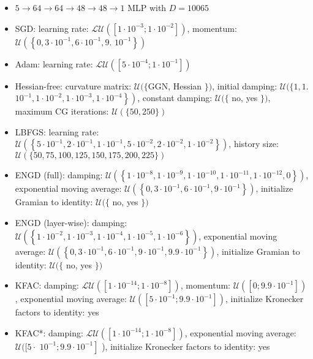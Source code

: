 \documentclass[10pt]{article}
\begin{document}
\begin{itemize}
  \item $5 \rightarrow 64 \rightarrow 64 \rightarrow 48 \rightarrow 48 \rightarrow 1$ MLP with $D=10065$
  \item SGD: learning rate: $\mathcal{L U}\left(\left[1 \cdot 10^{-3} ; 1 \cdot 10^{-2}\right]\right)$, momentum: $\mathcal{U}\left(\left\{0,3 \cdot 10^{-1}, 6 \cdot 10^{-1}, 9\right.\right.$. $\left.\left.10^{-1}\right\}\right)$
  \item Adam: learning rate: $\mathcal{L U}\left(\left[5 \cdot 10^{-4} ; 1 \cdot 10^{-1}\right]\right)$
  \item Hessian-free: curvature matrix: $\mathcal{U}(\{\mathrm{GGN}$, Hessian $\})$, initial damping: $\mathcal{U}(\{1,1$. $\left.\left.10^{-1}, 1 \cdot 10^{-2}, 1 \cdot 10^{-3}, 1 \cdot 10^{-4}\right\}\right)$, constant damping: $\mathcal{U}(\{$ no, yes $\})$, maximum CG iterations: $\mathcal{U}(\{50,250\})$
  \item LBFGS: learning rate: $\mathcal{U}\left(\left\{5 \cdot 10^{-1}, 2 \cdot 10^{-1}, 1 \cdot 10^{-1}, 5 \cdot 10^{-2}, 2 \cdot 10^{-2}, 1 \cdot 10^{-2}\right\}\right)$, history size: $\mathcal{U}(\{50,75,100,125,150,175,200,225\})$
  \item ENGD (full): damping: $\mathcal{U}\left(\left\{1 \cdot 10^{-8}, 1 \cdot 10^{-9}, 1 \cdot 10^{-10}, 1 \cdot 10^{-11}, 1 \cdot 10^{-12}, 0\right\}\right)$, exponential moving average: $\mathcal{U}\left(\left\{0,3 \cdot 10^{-1}, 6 \cdot 10^{-1}, 9 \cdot 10^{-1}\right\}\right)$, initialize Gramian to identity: $\mathcal{U}(\{$ no, yes $\})$
  \item ENGD (layer-wise): damping: $\mathcal{U}\left(\left\{1 \cdot 10^{-2}, 1 \cdot 10^{-3}, 1 \cdot 10^{-4}, 1 \cdot 10^{-5}, 1 \cdot 10^{-6}\right\}\right)$, exponential moving average: $\mathcal{U}\left(\left\{0,3 \cdot 10^{-1}, 6 \cdot 10^{-1}, 9 \cdot 10^{-1}, 9.9 \cdot 10^{-1}\right\}\right)$, initialize Gramian to identity: $\mathcal{U}(\{$ no, yes $\})$
  \item KFAC: damping: $\mathcal{L U}\left(\left[1 \cdot 10^{-14} ; 1 \cdot 10^{-8}\right]\right)$, momentum: $\mathcal{U}\left(\left[0 ; 9.9 \cdot 10^{-1}\right]\right)$, exponential moving average: $\mathcal{U}\left(\left[5 \cdot 10^{-1} ; 9.9 \cdot 10^{-1}\right]\right)$, initialize Kronecker factors to identity: yes
  \item KFAC*: damping: $\mathcal{L U}\left(\left[1 \cdot 10^{-14} ; 1 \cdot 10^{-8}\right]\right)$, exponential moving average: $\mathcal{U}([5 \cdot$ $\left.10^{-1} ; 9.9 \cdot 10^{-1}\right]$ ), initialize Kronecker factors to identity: yes

\end{itemize}
\end{document}
